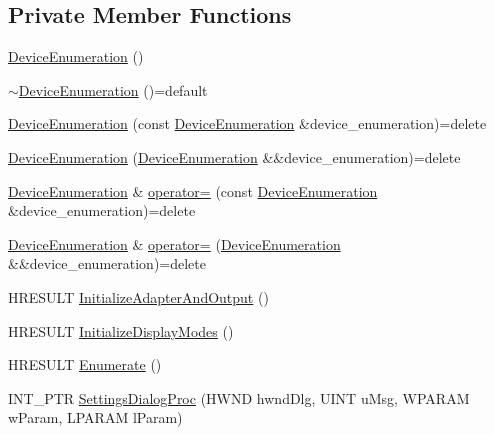 \subsection*{Private Member Functions}
\begin{DoxyCompactItemize}
\item 
\hyperlink{classmage_1_1_device_enumeration_aa000048648beb6c2aca70e5ef04e0da2}{Device\+Enumeration} ()
\item 
\hyperlink{classmage_1_1_device_enumeration_ae32bc5dacf47b7deca4729d8b3cb66dc}{$\sim$\+Device\+Enumeration} ()=default
\item 
\hyperlink{classmage_1_1_device_enumeration_a90f3dc13cfb413aa8a2a49a31bcb6ae3}{Device\+Enumeration} (const \hyperlink{classmage_1_1_device_enumeration}{Device\+Enumeration} \&device\+\_\+enumeration)=delete
\item 
\hyperlink{classmage_1_1_device_enumeration_a2f139e0a31c941d8dd5a0e1ecabe1ab9}{Device\+Enumeration} (\hyperlink{classmage_1_1_device_enumeration}{Device\+Enumeration} \&\&device\+\_\+enumeration)=delete
\item 
\hyperlink{classmage_1_1_device_enumeration}{Device\+Enumeration} \& \hyperlink{classmage_1_1_device_enumeration_a03e3affa2b8bb4837cffda7b11389bea}{operator=} (const \hyperlink{classmage_1_1_device_enumeration}{Device\+Enumeration} \&device\+\_\+enumeration)=delete
\item 
\hyperlink{classmage_1_1_device_enumeration}{Device\+Enumeration} \& \hyperlink{classmage_1_1_device_enumeration_accf36804bfe510cc8a4d8495854596d6}{operator=} (\hyperlink{classmage_1_1_device_enumeration}{Device\+Enumeration} \&\&device\+\_\+enumeration)=delete
\item 
H\+R\+E\+S\+U\+LT \hyperlink{classmage_1_1_device_enumeration_a56806d9667b446bf14236b1f42aefb28}{Initialize\+Adapter\+And\+Output} ()
\item 
H\+R\+E\+S\+U\+LT \hyperlink{classmage_1_1_device_enumeration_ac4644c68492b919362e21f2e47fbad93}{Initialize\+Display\+Modes} ()
\item 
H\+R\+E\+S\+U\+LT \hyperlink{classmage_1_1_device_enumeration_a4fea0ffef733632456b281f74608a239}{Enumerate} ()
\item 
I\+N\+T\+\_\+\+P\+TR \hyperlink{classmage_1_1_device_enumeration_a5950a6575d9073d6d23b228779f5ace1}{Settings\+Dialog\+Proc} (H\+W\+ND hwnd\+Dlg, U\+I\+NT u\+Msg, W\+P\+A\+R\+AM w\+Param, L\+P\+A\+R\+AM l\+Param)
\end{DoxyCompactItemize}
